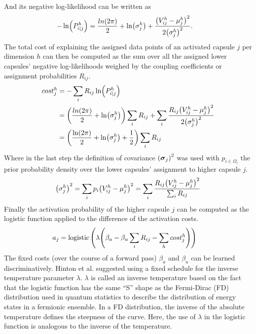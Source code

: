 And its negative log-likelihood can be written as
\begin{align}
    -\ln(P_{i|j}^h) &= \frac{ln(2\pi)}{2}+\ln(\sigma_j^h)+\frac{\qty(V_{ij}^h-\mu_j^h)^2}{2\qty(\sigma_j^h)^2}.
\end{align}
The total cost of explaining the assigned data points of an activated capsule $j$ per dimension $h$ can then be computed as the sum over all the assigned lower capsules' negative log-likelihoods weighed by the coupling coefficients or assignment probabilities $R_{ij}$.
\begin{align}
    cost_j^h &= - \sum_i R_{ij} \ln(P_{i|j}^h)\\
    &= \qty(\frac{ln(2\pi)}{2}+\ln(\sigma_j^h))\sum_i R_{ij}+\sum_i\frac{R_{ij}\qty(V_{ij}^h-\mu_j^h)^2}{2\qty(\sigma_j^h)^2}\\
    &= \qty(\frac{\ln(2\pi)}{2}+\ln(\sigma_j^h) + \frac{1}{2})\sum_i R_{ij}
\end{align}
Where in the last step the definition of covariance $\qty(\vb*{\sigma}_j)^2$ was used with $p_{i\in\Omega_l}$ the prior probability density over the lower capsules' assignment to higher capsule $j$.
\begin{align}
    \qty(\sigma_j^h)^2 = \sum_i p_i\qty(V_{ij}^h-\mu_j^h)^2 = \sum_i\frac{R_{ij} \qty(V_{ij}^h-\mu_j^h)^2}{\sum_i R_{ij}}
\end{align}
Finally the activation probability of the higher capsule $j$ can be computed as the logistic function applied to the difference of the activation costs.
\begin{align}\label{eq:matrix-logistic}
    a_j &= \operatorname{logistic}\qty(\lambda\qty(\beta_a-\beta_u\sum_i R_{ij}-\sum_h cost_j^h))
\end{align}
The fixed costs (over the course of a forward pass) $\beta_a$ and $\beta_u$ can be learned discriminatively. Hinton et al. suggested using a fixed schedule for the inverse temperature parameter $\lambda$. $\lambda$ is called an inverse temperature based on the fact that the logistic function\label{foot:fermi-dirac} has the same \enquote{S} shape as the Fermi-Dirac (FD) distribution used in quantum statistics to describe the distribution of energy states in a fermionic ensemble. In a FD distribution, the inverse of the absolute temperature defines the steepness of the curve. Here, the use of $\lambda$ in the logistic function is analogous to the inverse of the temperature.
